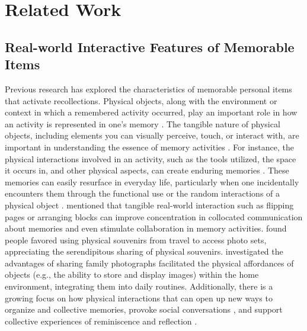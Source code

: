 \section{Related Work}
\subsection{Real-world Interactive Features of Memorable Items}

Previous research has explored the characteristics of memorable personal items that activate recollections. 
Physical objects, along with the environment or context in which a remembered activity occurred, play an important role in how an activity is represented in one's memory \cite{10.1145/2702613.2732842,kawamura2007ubiquitous,li2020facilitating,10.1145/3027063.3052756}. 
The tangible nature of physical objects, including elements you can visually perceive, touch, or interact with, are important in understanding the essence of memory activities \cite{10.1145/1394445.1394472,10.1145/2702613.2732842,habermas2002souvenirs,marschall2019memory,10.1145/2470654.2466453}. 
For instance, the physical interactions involved in an activity, such as the tools utilized, the space it occurs in, and other physical aspects, can create enduring memories \cite{10.1145/1806923.1806924}.
These memories can easily resurface in everyday life, particularly when one incidentally encounters them through the functional use or the random interactions of a physical object \cite{petrelli2010family,KALNIKAITE2011298,west2007memento}.  
\citet{10.1145/3024969.3024996} mentioned that tangible real-world interaction such as flipping pages or arranging blocks can improve concentration in collocated communication about memories and even stimulate collaboration in memory activities. 
\citet{10.1145/1394445.1394472} found people favored using physical souvenirs from travel to access photo sets, appreciating the serendipitous sharing of physical souvenirs.
\citet{10.1145/1517664.1517678} investigated the advantages of sharing family photographs facilitated the physical affordances of objects (e.g., the ability to store and display images) within the home environment, integrating them into daily routines.
Additionally, there is a growing focus on how physical interactions that can open up new ways to organize and collective memories, provoke social conversations \cite{hawkins2015postulater,hilliges2009getting,10.1145/3332165.3347877}, and support collective experiences of reminiscence and reflection \cite{hawkins2015postulater,jansen2014pearl,10.1145/2317956.2318055,10.1145/1753326.1753635,10.1145/2598510.2598589,10.1145/1394445.1394461,10.1145/3332165.3347877}.

